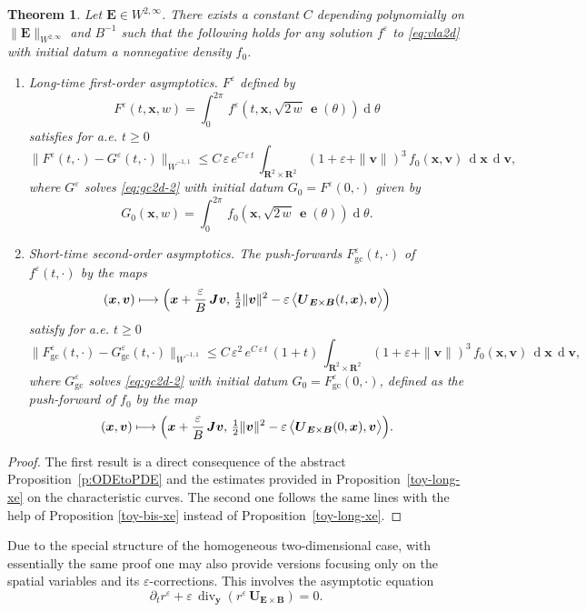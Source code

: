 \documentclass[JEP,XML,SOM,Unicode]{cedram}
\newenvironment{enumeratei}
{\bgroup\def\theenumi{\roman{enumi}}\def\theenumii{\arabic{enumii}}\begin{enumerate}}
{\end{enumerate}\egroup}
\newcommand\mto{\mathchoice{\longmapsto}{\mapsto}{\mapsto}{\mapsto}}
\newcommand{\blangle}{\bigl\langle}
\newcommand{\brangle}{\bigr\rangle}
\let\eps\varepsilon
\let\d\partial
\DeclareMathOperator\dD{d}\let\dd\dD
\DeclareMathOperator{\Div}{div}
\theoremstyle{plain}
\newtheorem{theorem}{Theorem}[section]
\theoremstyle{definition}
\newcommand{\be}{\begin{equation}}
\newcommand{\ee}{\end{equation}}
\newcommand{\bt}{\begin{theorem}}
\newcommand{\et}{\end{theorem}}
\newcommand\R{\mathbf R}
\newcommand\bB{{\boldsymbol B}}
\newcommand\bE{{\boldsymbol E}}
\newcommand\bJ{{\boldsymbol J}}
\newcommand\bU{{\boldsymbol U}}
\newcommand\bfv{{\boldsymbol v}}
\newcommand\bfx{{\boldsymbol x}}
\newcommand\bfy{{\boldsymbol y}}
\DeclareMathOperator{\beD}{\boldsymbol{e}}
\let\e w
\newcommand{\EcB}{\bU_{\bE\times\bB}}
\begin{document}
\bt
\label{toy-density}
Let $\bE\in W^{2,\infty}$. There exists a constant $C$ depending polynomially on $\|\bE\|_{W^{2,\infty}}$ and $B^{-1}$ such that the following holds for any solution $f^\eps$ to \eqref{eq:vla2d} with initial datum a nonnegative density $f_0$.
\begin{enumeratei}
\item
\emph{Long-time first-order asymptotics}. $F^\eps$ defined by
\[
F^\eps(t,\bfx,\e)=\int_0^{2\pi}\,f^\eps(t,\bfx,\sqrt{2\,\e}\,\beD(\theta))\dD \theta
\]
satisfies for a.e. $t\geq0$
\[
\|F^\eps(t,\cdot)-G^\eps(t,\cdot)\|_{\dot{W}^{-1,1}}\leq C\,\eps\,e^{C\,\eps\,t}\,\int_{\R^2\times\R^2}(1+\eps+\|\bfv\|)^3\,f_0(\bfx,\bfv)\,\dD\bfx\,\dD\bfv,
\]
where $G^\eps$ solves \eqref{eq:gc2d-2} with initial datum $G_0=F^\eps(0,\cdot)$ given by
\[
G_0(\bfx,\e)=\int_0^{2\pi}\,f_0(\bfx,\sqrt{2\,\e}\,\beD(\theta))\dD \theta.
\]

\item
\emph{Short-time second-order asymptotics}. The push-forwards $F_\mathrm{gc}^\eps(t,\cdot)$ of $f^\eps(t,\cdot)$ by the maps
\[
(\bfx,\bfv)\mto \Bigl(\bfx+\frac{\eps}{B}\,\bJ\bfv,\,
\tfrac12\|\bfv\|^2-\eps\,\blangle\EcB(t,\bfx),\bfv\brangle\Bigr)
\]
satisfy for a.e. $t\geq0$
\[
\|F_\mathrm{gc}^\eps(t,\cdot)-G_\mathrm{gc}^\eps(t,\cdot)\|_{\dot{W}^{-1,1}}\leq C\,\eps^2\,e^{C\,\eps\,t}\,(1+t)\,\int_{\R^2\times\R^2}(1+\eps+\|\bfv\|)^3\,f_0(\bfx,\bfv)\,\dD\bfx\,\dD\bfv,
\]
where $G_\mathrm{gc}^\eps$ solves \eqref{eq:gc2d-2} with initial datum $G_0=F_\mathrm{gc}^\eps(0,\cdot)$, defined as the push-forward of $f_0$ by the map
\[
(\bfx,\bfv)\mto \Bigl(\bfx+\frac{\eps}{B}\,\bJ\bfv,\,
\tfrac12\|\bfv\|^2-\eps\,\blangle\EcB(0,\bfx),\bfv\brangle\Bigr).
\]
\end{enumeratei}
\et
\begin{proof}
The first result is a direct consequence of the abstract Proposition~\ref{p:ODEtoPDE} and the estimates provided in Proposition~\ref{toy-long-xe} on the characteristic curves. The second one follows the same lines with the help of Proposition \ref{toy-bis-xe} instead of Proposition~\ref{toy-long-xe}.
\end{proof}

Due to the special structure of the homogeneous two-dimensional case, with essentially the same proof one may also provide versions focusing only on the spatial variables and its $\eps$-corrections. This involves the asymptotic equation
\be\label{eq:gc2d-2x}
\d_t r^\eps+\eps\,\Div_\bfy\left(r^\eps\,\EcB\right)
=0.
\ee
\end{document}
